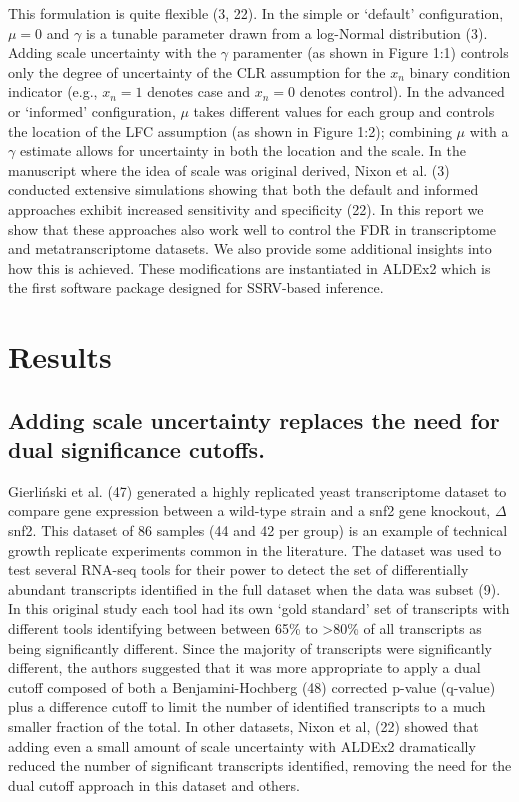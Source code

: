 \documentclass[
]{article}
\begin{document}
This formulation is quite flexible (3, 22). In the simple or `default'
configuration, \(\mu = 0\) and \(\gamma\) is a tunable parameter drawn
from a log-Normal distribution (3). Adding scale uncertainty with the
\(\gamma\) paramenter (as shown in Figure 1:1) controls only the degree
of uncertainty of the CLR assumption for the \(x_{n}\) binary condition
indicator (e.g., \(x_{n}=1\) denotes case and \(x_{n}=0\) denotes
control). In the advanced or `informed' configuration, \(\mu\) takes
different values for each group and controls the location of the LFC
assumption (as shown in Figure 1:2); combining \(\mu\) with a \(\gamma\)
estimate allows for uncertainty in both the location and the scale. In
the manuscript where the idea of scale was original derived, Nixon et
al. (3) conducted extensive simulations showing that both the default
and informed approaches exhibit increased sensitivity and specificity
(22). In this report we show that these approaches also work well to
control the FDR in transcriptome and metatranscriptome datasets. We also
provide some additional insights into how this is achieved. These
modifications are instantiated in ALDEx2 which is the first software
package designed for SSRV-based inference.

\section{Results}\label{results}

\subsection{Adding scale uncertainty replaces the need for dual
significance
cutoffs.}\label{adding-scale-uncertainty-replaces-the-need-for-dual-significance-cutoffs.}

Gierliński et al. (47) generated a highly replicated yeast transcriptome
dataset to compare gene expression between a wild-type strain and a snf2
gene knockout, \(\Delta\)snf2. This dataset of 86 samples (44 and 42 per
group) is an example of technical growth replicate experiments common in
the literature. The dataset was used to test several RNA-seq tools for
their power to detect the set of differentially abundant transcripts
identified in the full dataset when the data was subset (9). In this
original study each tool had its own `gold standard' set of transcripts
with different tools identifying between between 65\% to
\textgreater80\% of all transcripts as being significantly different.
Since the majority of transcripts were significantly different, the
authors suggested that it was more appropriate to apply a dual cutoff
composed of both a Benjamini-Hochberg (48) corrected p-value (q-value)
plus a difference cutoff to limit the number of identified transcripts
to a much smaller fraction of the total. In other datasets, Nixon et al,
(22) showed that adding even a small amount of scale uncertainty with
ALDEx2 dramatically reduced the number of significant transcripts
identified, removing the need for the dual cutoff approach in this
dataset and others.
\end{document}

